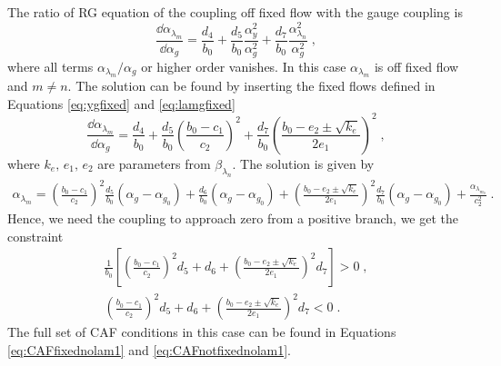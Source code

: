 The ratio of RG equation of the coupling off fixed flow with the gauge coupling is 
\begin{equation}
    \frac{\dd \alpha_{\lambda_m}}{\dd \alpha_g}= \frac{d_4}{b_0}+\frac{d_5}{b_0}\frac{\alpha_y^2}{\alpha_g^2}+\frac{d_7}{b_0}\frac{\alpha_{\lambda_n}^2}{\alpha_g^2}\;,
\end{equation}
where all terms $\alpha_{\lambda_m}/\alpha_g$ or higher order vanishes. In this case $\alpha_{\lambda_m}$ is off fixed flow and $m\neq n$. The solution can be found by inserting the fixed flows defined in Equations \eqref{eq:ygfixed} and \eqref{eq:lamgfixed}
\begin{equation}
    \frac{\dd \alpha_{\lambda_m}}{\dd \alpha_g}= \frac{d_4}{b_0}+\frac{d_5}{b_0}\left(\frac{b_0-c_1}{c_2}\right)^2+\frac{d_7}{b_0}\left(\frac{b_0-e_2\pm\sqrt{k_e}}{2e_1}\right)^2\;,
\end{equation}
where $k_e,\, e_1,\, e_2$ are parameters from $\beta_{\lambda_n}$.
The solution is given by
\begin{align}
    \alpha_{\lambda_m}=\left(\frac{b_0-c_1}{c_2}\right)^2\frac{d_5}{b_0}(\alpha_g-\alpha_{g_0})+\frac{d_6}{b_0}(\alpha_g-\alpha_{g_0})+\left(\frac{b_0-e_2\pm\sqrt{k_e}}{2e_1}\right)^2\frac{d_7}{b_0}(\alpha_g-\alpha_{g_0})+\frac{\alpha_{\lambda_{m_0}}}{c_2^2}\;.
\end{align}
 Hence, we need the coupling to approach zero from a positive branch, we get the constraint 
\begin{align}
    \frac{1}{b_0}\left[\left(\frac{b_0-c_1}{c_2}\right)^2d_5+d_6+\left(\frac{b_0-e_2\pm\sqrt{k_e}}{2e_1}\right)^2d_7\right]>0\;,\\ \left(\frac{b_0-c_1}{c_2}\right)^2d_5+d_6+\left(\frac{b_0-e_2\pm\sqrt{k_e}}{2e_1}\right)^2d_7<0\;.
\end{align}
The full set of CAF conditions in this case can be found in Equations \ref{eq:CAFfixednolam1} and \ref{eq:CAFnotfixednolam1}. 
